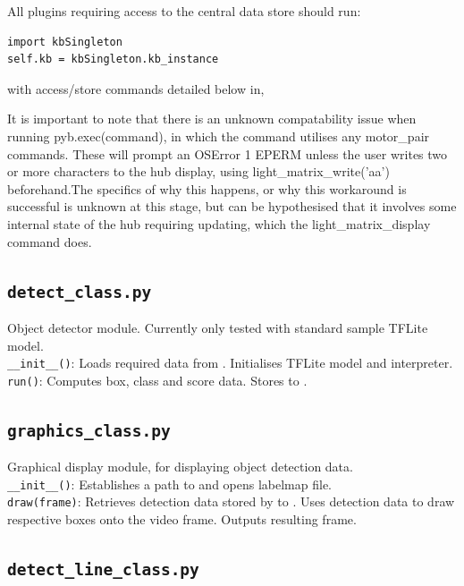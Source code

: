 \documentclass[10pt]{article}
\begin{document}
All plugins requiring access to the central data store should run:\\ 
\begin{verbatim}
import kbSingleton 
self.kb = kbSingleton.kb_instance
\end{verbatim}

with access/store commands detailed below in, %

\hfill

It is important to note that there is an unknown compatability issue when running pyb.exec(command), in which the command utilises any motor\_pair commands. These will prompt an OSError 1 EPERM unless the user writes two or more characters to the hub display, using light\_matrix\_write('aa') beforehand.The specifics of why this happens, or why this workaround is successful is unknown at this stage, but can be hypothesised that it involves some internal state of the hub requiring updating, which the light\_matrix\_display command does.

\subsection{\texttt{detect\_class.py}}
\label{sec:detect_class.py}

Object detector module. Currently only tested with standard sample TFLite model.
\\
\texttt{\_\_init\_\_()}: Loads required data from . Initialises TFLite model and interpreter.
\\\texttt{run()}: Computes box, class and score data. Stores to .

\subsection{\texttt{graphics\_class.py}}
\label{sec:graphics_class.py}

Graphical display module, for displaying  object detection data. 
\\
\texttt{\_\_init\_\_()}: Establishes a path to and opens labelmap file.
\\\texttt{draw(frame)}: Retrieves detection data stored by  to . Uses detection data to draw respective boxes onto the video frame. Outputs resulting frame.

\subsection{\texttt{detect\_line\_class.py}}
\label{sec:detect_line_class.py}
\end{document}
